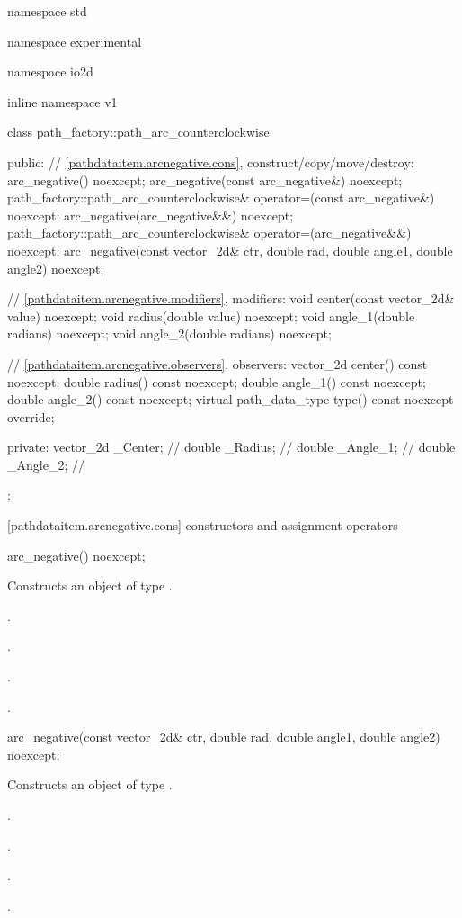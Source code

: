 \begin{codeblock}
namespace std { namespace experimental { namespace io2d { inline namespace v1 {
  class path_factory::path_arc_counterclockwise {
  public:
    // \ref{pathdataitem.arcnegative.cons}, construct/copy/move/destroy:
    arc_negative() noexcept;
    arc_negative(const arc_negative&) noexcept;
    path_factory::path_arc_counterclockwise& operator=(const arc_negative&) noexcept;
    arc_negative(arc_negative&&) noexcept;
    path_factory::path_arc_counterclockwise& operator=(arc_negative&&) noexcept;
    arc_negative(const vector_2d& ctr, double rad, double angle1,
      double angle2) noexcept;

    // \ref{pathdataitem.arcnegative.modifiers}, modifiers:
    void center(const vector_2d& value) noexcept;
    void radius(double value) noexcept;
    void angle_1(double radians) noexcept;
    void angle_2(double radians) noexcept;

    // \ref{pathdataitem.arcnegative.observers}, observers:
    vector_2d center() const noexcept;
    double radius() const noexcept;
    double angle_1() const noexcept;
    double angle_2() const noexcept;
    virtual path_data_type type() const noexcept override;

  private:
    vector_2d _Center;   // \expos
    double _Radius;  // \expos
    double _Angle_1; // \expos
    double _Angle_2; // \expos
  };
} } } }
\end{codeblock}

 [pathdataitem.arcnegative.cons] { constructors and assignment operators}

\begin{itemdecl}
    arc_negative() noexcept;
\end{itemdecl}
\begin{itemdescr}
	\pnum
	\effects
	Constructs an object of type .
	
	\pnum
	\postconditions
	.

	.

	.

	.
\end{itemdescr}

\begin{itemdecl}
    arc_negative(const vector_2d& ctr, double rad, double angle1,
      double angle2) noexcept;
\end{itemdecl}
\begin{itemdescr}
	\pnum
	\effects
	Constructs an object of type .
	
	\pnum
	\postconditions
	.

	.

	.

	.
\end{itemdescr}

